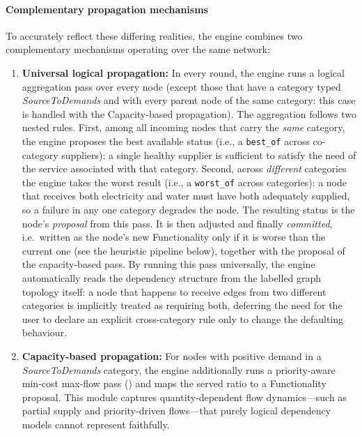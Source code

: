 \documentclass[review,12pt]{elsarticle}
\begin{document}
\paragraph{Complementary propagation mechanisms}
To accurately reflect these differing realities, the engine combines two complementary mechanisms operating over the same network:
\begin{enumerate}
  \item \textbf{Universal logical propagation:} In every round, the engine runs a logical aggregation pass over every node (except those that have a category typed \emph{SourceToDemands} and with every parent node of the same category: this case is handled with the Capacity-based propagation). The aggregation follows two nested rules. First, among all incoming nodes that carry the \emph{same} category, the engine proposes the best available status (i.e., a \texttt{best\_of} across co-category suppliers): a single healthy supplier is sufficient to satisfy the need of the service associated with that category. Second, across \emph{different} categories the engine takes the worst result (i.e., a \texttt{worst\_of} across categories): a node that receives both electricity and water must have both adequately supplied, so a failure in any one category degrades the node. The resulting status is the node's \emph{proposal} from this pass. It is then adjusted and finally \emph{committed}, i.e.\ written as the node's new Functionality only if it is worse than the current one (see the heuristic pipeline below), together with the proposal of the capacity-based pass. By running this pass universally, the engine automatically reads the dependency structure from the labelled graph topology itself: a node that happens to receive edges from two different categories is implicitly treated as requiring both, deferring the need for the user to declare an explicit cross-category rule only to change the defaulting behaviour.
  \item \textbf{Capacity-based propagation:} For nodes with positive demand in a \emph{SourceToDemands} category, the engine additionally runs a priority-aware min-cost max-flow pass (\cite{edmonds1972theoretical,orlin1997polynomial,SciPyProceedings_11}) and maps the served ratio to a Functionality proposal. This module captures quantity-dependent flow dynamics---such as partial supply and priority-driven flows---that purely logical dependency models cannot represent faithfully.
\end{enumerate}
\end{document}
